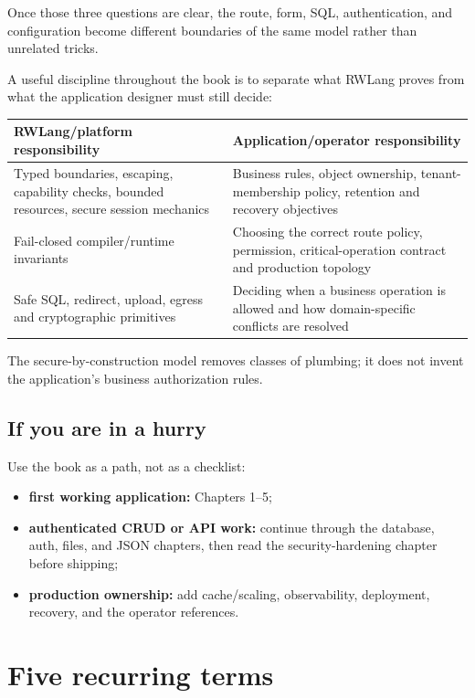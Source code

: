 Once those three questions are clear, the route, form, SQL, authentication, and configuration become different boundaries of the same model rather than unrelated tricks.

A useful discipline throughout the book is to separate what RWLang proves from what the application designer must still decide:

\begin{center}
\begin{tabularx}{\textwidth}{@{}Y Y@{}}
\toprule
\textbf{RWLang/platform responsibility} & \textbf{Application/operator responsibility} \\
\midrule
Typed boundaries, escaping, capability checks, bounded resources, secure session mechanics & Business rules, object ownership, tenant-membership policy, retention and recovery objectives \\
Fail-closed compiler/runtime invariants & Choosing the correct route policy, permission, critical-operation contract and production topology \\
Safe SQL, redirect, upload, egress and cryptographic primitives & Deciding when a business operation is allowed and how domain-specific conflicts are resolved \\
\bottomrule
\end{tabularx}
\end{center}

The secure-by-construction model removes classes of plumbing; it does not invent the application's business authorization rules.

\subsection*{If you are in a hurry}

Use the book as a path, not as a checklist:

\begin{itemize}
  \item \textbf{first working application:} Chapters 1--5;
  \item \textbf{authenticated CRUD or API work:} continue through the database, auth, files, and JSON chapters, then read the security-hardening chapter before shipping;
  \item \textbf{production ownership:} add cache/scaling, observability, deployment, recovery, and the operator references.
\end{itemize}

\section*{Five recurring terms}

